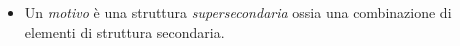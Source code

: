 \documentclass{beamer}
\begin{document}
\begin{frame}
  \begin{itemize}
  \item  	Un \emph{motivo} è una struttura \emph{supersecondaria} ossia una combinazione di elementi di struttura secondaria.
\end{itemize}

\end{frame}
\end{document}
